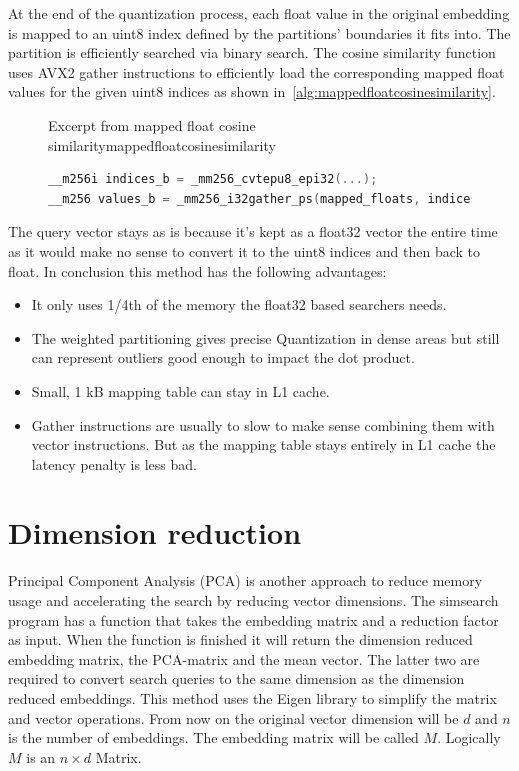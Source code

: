 At the end of the quantization process, each float value in the original embedding is mapped to an uint8 index defined by the partitions' boundaries it fits into. The partition is efficiently searched via binary search. The cosine similarity function uses AVX2 gather instructions to efficiently load the corresponding mapped float values for the given uint8 indices as shown in~\autoref{alg:mappedfloatcosinesimilarity}.
\begin{figure}[h]
    \begin{algorithm}{Excerpt from mapped float cosine similarity}{mappedfloatcosinesimilarity}
        \begin{lstlisting}[language=C++]
__m256i indices_b = _mm256_cvtepu8_epi32(...);
__m256 values_b = _mm256_i32gather_ps(mapped_floats, indices_b, 4);
    \end{lstlisting}
    \end{algorithm}
\end{figure}
The query vector stays as is because it's kept as a float32 vector the entire time as it would make no sense to convert it to the uint8 indices and then back to float. In conclusion this method has the following advantages:
\begin{itemize}
    \item It only uses 1/4th of the memory the float32 based searchers needs.
    \item The weighted partitioning gives precise Quantization in dense areas but still can represent outliers good enough to impact the dot product.
    \item Small, 1 kB mapping table can stay in L1 cache.
    \item Gather instructions are usually to slow to make sense combining them with vector instructions. But as the mapping table stays entirely in L1 cache the latency penalty is less bad.
\end{itemize}

\section{Dimension reduction}
\label{sec:dimreduct}
Principal Component Analysis (PCA) is another approach to reduce memory usage and accelerating the search by reducing vector dimensions. The simsearch program has a function that takes the embedding matrix and a reduction factor as input. When the function is finished it will return the dimension reduced embedding matrix, the PCA-matrix and the mean vector. The latter two are required to convert search queries to the same dimension as the dimension reduced embeddings. This method uses the Eigen library to simplify the matrix and vector operations.
From now on the original vector dimension will be $d$ and $n$ is the number of embeddings. The embedding matrix will be called $M$. Logically $M$ is an $n \times d$ Matrix.

